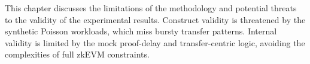 This chapter discusses the limitations of the methodology and potential threats to the validity of the experimental results.
Construct validity is threatened by the synthetic Poisson workloads, which miss bursty transfer patterns. Internal validity is limited by the mock proof-delay and transfer-centric logic, avoiding the complexities of full zkEVM constraints.

